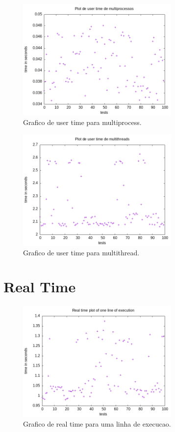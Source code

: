 \documentclass[12pt]{article}
\begin{document}
    \begin{figure}[H]
        \caption{Grafico de user time para multiprocess.}
        \centering
        \includegraphics[width=8cm]{doc/user_processos.png}
    \end{figure}

    \begin{figure}[H]
        \caption{Grafico de user time para multithread.}
        \centering
        \includegraphics[width=8cm]{doc/user_threads.png}
    \end{figure}


\section{Real Time}\label{results}
    \begin{figure}[H]
        \caption{Grafico de real time para uma linha de execucao.}
        \centering
        \includegraphics[width=8cm]{doc/real_simples.png}
    \end{figure}
\end{document}
